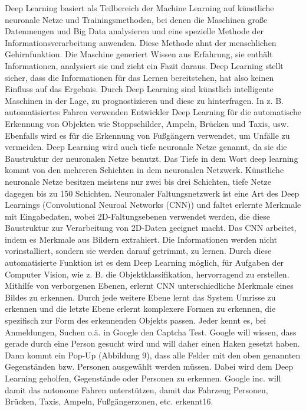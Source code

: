Deep Learning basiert als Teilbereich der Machine Learning auf künstliche neuronale Netze und Trainingsmethoden, bei denen die Maschinen große Datenmengen und 
Big Data analysieren und eine spezielle Methode der Informationsverarbeitung anwenden. Diese Methode ahnt der menschlichen Gehirnfunktion. 
Die Maschine generiert Wissen aus Erfahrung, sie enthält Informationen, analysiert sie und zieht ein Fazit daraus. Deep Learning stellt sicher, dass die 
Informationen für das Lernen bereitstehen, hat also keinen Einfluss auf das Ergebnis. Durch Deep Learning sind künstlich intelligente Maschinen in der Lage, 
zu prognostizieren und diese zu hinterfragen. In z. B. automatisiertes Fahren verwenden Entwickler Deep Learning für die automatische Erkennung von Objekten wie 
Stoppschilder, Ampeln, Brücken und Taxis, usw. Ebenfalls wird es für die Erkennung von Fußgängern verwendet, um Unfälle zu vermeiden. Deep Learning wird auch tiefe 
neuronale Netze genannt, da sie die Baustruktur der neuronalen Netze benutzt. Das Tiefe in dem Wort deep learning kommt von den mehreren Schichten in dem neuronalen 
Netzwerk. Künstliche neuronale Netze besitzen meistens nur zwei bis drei Schichten, tiefe Netze dagegen bis zu 150 Schichten. Neuronaler Faltungsnetzwerk ist eine Art
des Deep Learnings (Convolutional Neuroal Networks (CNN)) und faltet erlernte Merkmale mit Eingabedaten, wobei 2D-Faltungsebenen verwendet werden, 
die diese Baustruktur zur Verarbeitung von 2D-Daten geeignet macht. Das CNN arbeitet, indem es Merkmale aus Bildern extrahiert. Die Informationen werden nicht 
vorinstalliert, sondern sie werden darauf getrimmt, zu lernen. Durch diese automatisierte Funktion ist es dem Deep Learning möglich, für Aufgaben der Computer 
Vision, wie z. B. die Objektklassifikation, hervorragend zu erstellen. Mithilfe von verborgenen Ebenen, erlernt CNN unterschiedliche Merkmale eines Bildes 
zu erkennen. Durch jede weitere Ebene lernt das System Umrisse zu erkennen und die letzte Ebene erlernt komplexere Formen zu erkennen, die spezifisch zur Form 
des erkennenden Objekts passen. Jeder kennt es, bei Anmeldungen, Suchen o.ä. in Google den Captcha Test. Google will wissen, dass gerade durch eine Person gesucht 
wird und will daher einen Haken gesetzt haben. Dann kommt ein Pop-Up (Abbildung 9), dass alle Felder mit den oben genannten Gegenständen bzw. Personen ausgewählt 
werden müssen. Dabei wird dem Deep Learning geholfen, Gegenstände oder Personen zu erkennen. Google inc. will damit das autonome Fahren unterstützen, damit das 
Fahrzeug Personen, Brücken, Taxis, Ampeln, Fußgängerzonen, etc. erkennt16.

